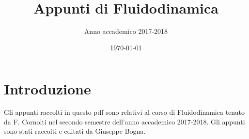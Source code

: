 \documentclass[a4paper,11pt]{report}
\title{Appunti di Fluidodinamica}
\author{Anno accademico 2017-2018}
\date{\today}
\begin{document}
\maketitle
\section*{Introduzione}
Gli appunti raccolti in questo pdf sono relativi al corso di Fluidodinamica tenuto da F. Cornolti nel secondo semestre dell'anno accademico 2017-2018. Gli appunti sono stati raccolti e editati da Giuseppe Bogna.
\tableofcontents
\end{document}
